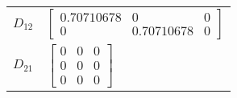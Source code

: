 \begin{tabular}{cl}
 $D_{12}$ & $\left[\begin{matrix}0.70710678 & 0 & 0\\0 & 0.70710678 & 0\end{matrix}\right]$                                                                                                                   \\
 $D_{21}$ & $\left[\begin{matrix}0 & 0 & 0\\0 & 0 & 0\\0 & 0 & 0\end{matrix}\right]$                                                                                                                          \\
\hline
\end{tabular}